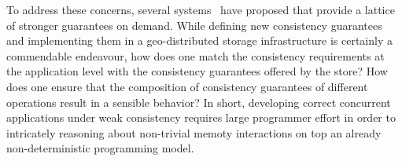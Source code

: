 To address these concerns, several systems~\cite{COPS, Eiger, Walter,
CausalConsistency, RedBlue, HAT} have proposed that provide a lattice of
stronger guarantees on demand. While defining new consistency guarantees and
implementing them in a geo-distributed storage infrastructure is certainly a
commendable endeavour, how does one match the consistency requirements at the
application level with the consistency guarantees offered by the store? How
does one ensure that the composition of consistency guarantees of different
operations result in a sensible behavior? In short, developing correct
concurrent applications under weak consistency requires large programmer effort
in order to intricately reasoning about non-trivial memoty interactions on top
an already non-deterministic programming model.



